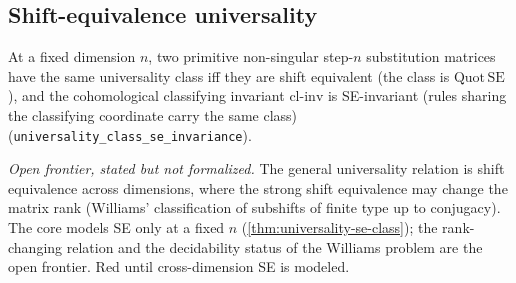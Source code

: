 \subsection{Shift-equivalence universality}

\begin{theorem}[Universality class $=$ fixed-dimension shift-equivalence class]\label{thm:universality-se-class}\leanok{}
At a fixed dimension $n$, two primitive non-singular step-$n$ substitution
matrices have the same universality class iff they are shift equivalent (the
class is $\mathrm{Quot}\,\mathrm{SE}$), and the cohomological classifying
invariant $\mathrm{cl\text{-}inv}$ is SE-invariant (rules sharing the
classifying coordinate carry the same class)
(\texttt{universality\_class\_se\_invariance}).
\end{theorem}

\begin{theorem}\label{thm:universality-cross-dim-se}\notready{}
\emph{Open frontier, stated but not formalized.} The general universality
relation is shift equivalence across dimensions, where the strong shift
equivalence may change the matrix rank (Williams' classification of subshifts
of finite type up to conjugacy). The core models SE only at a fixed $n$
(\cref{thm:universality-se-class}); the rank-changing relation and the
decidability status of the Williams problem are the open frontier. Red until
cross-dimension SE is modeled.
\end{theorem}

